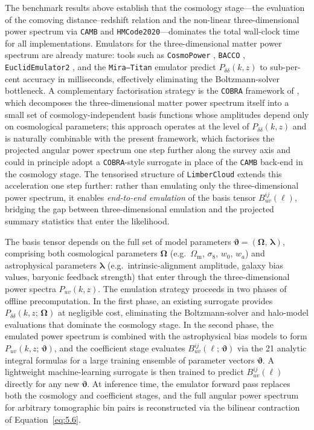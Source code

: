 The benchmark results above establish that the cosmology stage---the evaluation of the comoving distance--redshift relation and the non-linear three-dimensional power spectrum via \texttt{CAMB} and \texttt{HMCode2020}---dominates the total wall-clock time for all implementations. Emulators for the three-dimensional matter power spectrum are already mature: tools such as \texttt{CosmoPower} \citep{2022MNRAS.511.1771S}, \texttt{BACCO} \citep{2021MNRAS.507.5869A}, \texttt{EuclidEmulator2} \citep{2021MNRAS.505.2840E}, and the \texttt{Mira--Titan} emulator \citep{2017ApJ...847...50L} predict \(P_{\delta\delta}(k,z)\) to sub-per-cent accuracy in milliseconds, effectively eliminating the Boltzmann-solver bottleneck. A complementary factorisation strategy is the \texttt{COBRA} framework of \citet{2025PhRvL.134s1002B}, which decomposes the three-dimensional matter power spectrum itself into a small set of cosmology-independent basis functions whose amplitudes depend only on cosmological parameters; this approach operates at the level of \(P_{\delta\delta}(k,z)\) and is naturally combinable with the present framework, which factorises the projected angular power spectrum one step further along the survey axis and could in principle adopt a \texttt{COBRA}-style surrogate in place of the \texttt{CAMB} back-end in the cosmology stage. The tensorised structure of \texttt{LimberCloud} extends this acceleration one step further: rather than emulating only the three-dimensional power spectrum, it enables \textit{end-to-end emulation} of the basis tensor \(B_{uv}^{ij}(\ell)\), bridging the gap between three-dimensional emulation and the projected summary statistics that enter the likelihood.

The basis tensor depends on the full set of model parameters \(\boldsymbol{\vartheta} = (\boldsymbol{\Omega},\, \boldsymbol{\lambda})\), comprising both cosmological parameters \(\boldsymbol{\Omega}\) (e.g.\ \(\Omega_\mathrm{m}\), \(\sigma_8\), \(w_0\), \(w_a\)) and astrophysical parameters \(\boldsymbol{\lambda}\) (e.g.\ intrinsic-alignment amplitude, galaxy bias values, baryonic feedback strength) that enter through the three-dimensional power spectra \(P_{uv}(k,z)\). The emulation strategy proceeds in two phases of offline precomputation. In the first phase, an existing surrogate provides \(P_{\delta\delta}(k,z;\,\boldsymbol{\Omega})\) at negligible cost, eliminating the Boltzmann-solver and halo-model evaluations that dominate the cosmology stage. In the second phase, the emulated power spectrum is combined with the astrophysical bias models to form \(P_{uv}(k,z;\,\boldsymbol{\vartheta})\), and the coefficient stage evaluates \(B_{uv}^{ij}(\ell;\,\boldsymbol{\vartheta})\) via the 21 analytic integral formulas for a large training ensemble of parameter vectors \(\boldsymbol{\vartheta}\). A lightweight machine-learning surrogate is then trained to predict \(B_{uv}^{ij}(\ell)\) directly for any new \(\boldsymbol{\vartheta}\). At inference time, the emulator forward pass replaces both the cosmology and coefficient stages, and the full angular power spectrum for arbitrary tomographic bin pairs is reconstructed via the bilinear contraction of Equation~\ref{eq:5.6}.

